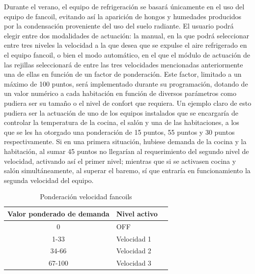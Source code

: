 \begin{itemize}
Durante el verano, el equipo de refrigeración se basará únicamente en el uso del equipo de fancoil, evitando así la aparición de hongos y humedades producidos por la condensación proveniente del uso del suelo radiante. El usuario podrá elegir entre dos modalidades de actuación: la manual, en la que podrá seleccionar entre tres niveles la velocidad a la que desea que se expulse el aire refrigerado en el equipo fancoil, o bien el modo automático, en el que el módulo de actuación de las rejillas seleccionará de entre las tres velocidades mencionadas anteriormente una de ellas en función de un factor de ponderación. Este factor, limitado a un máximo de 100 puntos, será implementado durante su programación, dotando de un valor numérico a cada habitación en función de diversos parámetros como pudiera ser su tamaño o el nivel de confort que requiera. Un ejemplo claro de esto pudiera ser la actuación de uno de los equipos instalados que se encargaría de controlar la temperatura de la cocina, el salón y una de las habitaciones, a los que se les ha otorgado una ponderación de 15 puntos, 55 puntos y 30 puntos respectivamente. Si en una primera situación, hubiese demanda de la cocina y la habitación, al sumar 45 puntos no llegarían al requerimiento del segundo nivel de velocidad, activando así el primer nivel; mientras que si se activasen cocina y salón simultáneamente, al superar el baremo, sí que entraría en funcionamiento la segunda velocidad del equipo.\\
\begin{table}[h]
\begin{center}
\begin{tabular}{| c | l | c |} \hline
\textbf{Valor ponderado de demanda} & \textbf{Nivel activo} \\ \hline
0 & OFF \\ \hline
1-33 & Velocidad 1 \\ \hline
34-66 & Velocidad 2 \\ \hline
67-100 & Velocidad 3 \\ \hline
\end{tabular}
\caption{Ponderación velocidad fancoils}
\label{tab:vel_fancoils}
\end{center}
\end{table}


\end{itemize}
